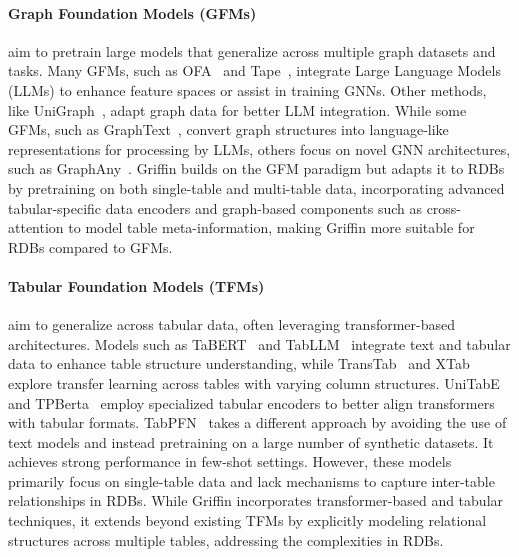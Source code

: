 \documentclass{article}
\theoremstyle{plain}
\theoremstyle{definition}
\theoremstyle{remark}
\begin{document}
\paragraph{Graph Foundation Models (GFMs)} aim to pretrain large models that generalize across multiple graph datasets and tasks. Many GFMs, such as OFA~\citep{liu2023one} and Tape~\citep{he2023harnessing}, integrate Large Language Models (LLMs) to enhance feature spaces or assist in training GNNs. Other methods, like UniGraph~\citep{he2024unigraph}, adapt graph data for better LLM integration. While some GFMs, such as GraphText~\citep{zhao2023graphtext}, convert graph structures into language-like representations for processing by LLMs, others focus on novel GNN architectures, such as GraphAny~\citep{zhao2024graphany}. Griffin builds on the GFM paradigm but adapts it to RDBs by pretraining on both single-table and multi-table data, incorporating advanced tabular-specific data encoders and graph-based components such as cross-attention to model table meta-information, making Griffin more suitable for RDBs compared to GFMs.

\vspace*{-0.3cm}
\paragraph{Tabular Foundation Models (TFMs)} aim to generalize across tabular data, often leveraging transformer-based architectures. Models such as TaBERT~\citep{yin2020tabert} and TabLLM~\citep{hegselmann2023tabllm} integrate text and tabular data to enhance table structure understanding, while TransTab~\citep{wang2022transtab} and XTab~\citep{zhu2023xtab} explore transfer learning across tables with varying column structures. UniTabE~\citep{yang2024unitabe} and TPBerta~\citep{yan2024making} employ specialized tabular encoders to better align transformers with tabular formats.
TabPFN~\citep{hollmann2022tabpfn, hollmann2025accurate} takes a different approach by avoiding the use of text models and instead pretraining on a large number of synthetic datasets. It achieves strong performance in few-shot settings.
However, these models primarily focus on single-table data and lack mechanisms to capture inter-table relationships in RDBs. While Griffin incorporates transformer-based and tabular techniques, it extends beyond existing TFMs by explicitly modeling relational structures across multiple tables, addressing the complexities in RDBs.

\vspace*{-0.1cm}
\end{document}

